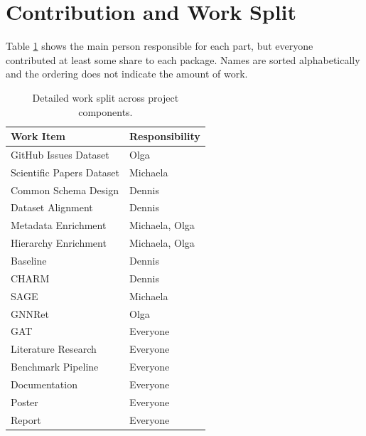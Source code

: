 \documentclass[11pt]{article}
\begin{document}
%



\appendix

\section{Contribution and Work Split}

Table \ref{tab:work_split} shows the main person responsible for each part, but everyone contributed at least some share to each package. Names are sorted alphabetically and the ordering does not indicate the amount of work. 

\begin{table}[ht]
  \centering
  \small
  \begin{tabular}{p{3.2cm}p{3.2cm}}
    \toprule
    \textbf{Work Item} & \textbf{Responsibility} \\
    \midrule
    GitHub Issues Dataset & Olga \\
    Scientific Papers Dataset & Michaela \\
    Common Schema Design & Dennis \\
    Dataset Alignment & Dennis \\
    Metadata Enrichment & Michaela, Olga \\
    Hierarchy Enrichment & Michaela, Olga \\
    \midrule
    Baseline & Dennis \\
    CHARM & Dennis \\
    SAGE & Michaela \\
    GNNRet & Olga \\
    GAT & Everyone \\
    \midrule
    Literature Research & Everyone \\
    Benchmark Pipeline & Everyone \\
    Documentation & Everyone \\
    Poster & Everyone \\
    Report & Everyone \\
    \bottomrule
  \end{tabular}
  \caption{Detailed work split across project components.}
  \label{tab:work_split}
\end{table}

\end{document}
